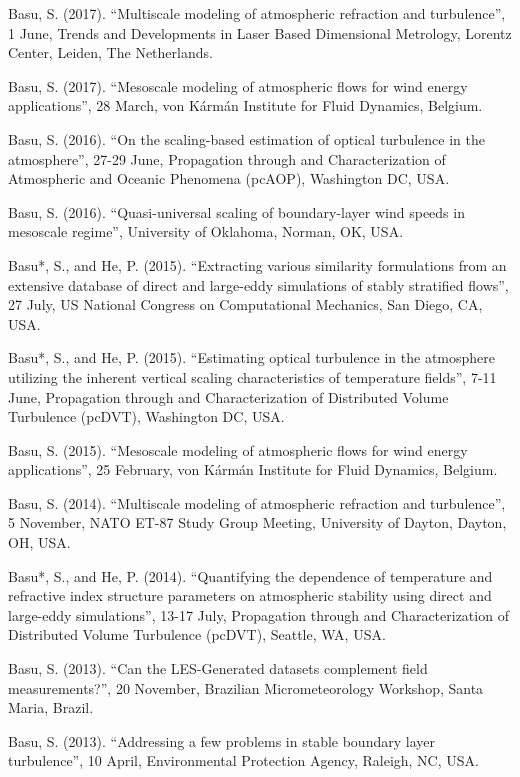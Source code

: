 \begin{etaremune}[topsep=0pt,itemsep=0pt,partopsep=0pt,parsep=0pt]
    \item Basu, S. (2017). ``Multiscale modeling of atmospheric refraction and turbulence'', 1 June, Trends and Developments in Laser Based Dimensional Metrology, Lorentz Center, Leiden, The Netherlands.
    \item Basu, S. (2017). ``Mesoscale modeling of atmospheric flows for wind energy applications'', 28 March, von K\'{a}rm\'{a}n Institute for Fluid Dynamics, Belgium.
    \item Basu, S. (2016). ``On the scaling-based estimation of optical turbulence in the atmosphere'', 27-29 June, Propagation through and Characterization of Atmospheric and Oceanic Phenomena (pcAOP), Washington DC, USA.
    \item Basu, S. (2016). ``Quasi-universal scaling of boundary-layer wind speeds in mesoscale regime'', University of Oklahoma, Norman, OK, USA.
    \item Basu*, S., and He, P. (2015). “Extracting various similarity formulations from an extensive database of direct and large-eddy simulations of stably stratified flows”, 27 July, US National Congress on Computational Mechanics, San Diego, CA, USA.
    \item Basu*, S., and He, P. (2015). ``Estimating optical turbulence in the atmosphere utilizing the inherent vertical scaling characteristics of temperature fields'', 7-11 June, Propagation through and Characterization of Distributed Volume Turbulence (pcDVT), Washington DC, USA.
    \item Basu, S. (2015). ``Mesoscale modeling of atmospheric flows for wind energy applications'', 25 February, von Kármán Institute for Fluid Dynamics, Belgium. 
    \item Basu, S. (2014). ``Multiscale modeling of atmospheric refraction and turbulence'', 5 November, NATO ET-87 Study Group Meeting, University of Dayton, Dayton, OH, USA. 
    \item Basu*, S., and He, P. (2014). ``Quantifying the dependence of temperature and refractive index structure parameters on atmospheric stability using direct and large-eddy simulations'', 13-17 July, Propagation through and Characterization of Distributed Volume Turbulence (pcDVT), Seattle, WA, USA. 
    \item Basu, S. (2013). ``Can the LES-Generated datasets complement field measurements?'', 20 November, Brazilian Micrometeorology Workshop, Santa Maria, Brazil.  
    \item Basu, S. (2013). ``Addressing a few problems in stable boundary layer turbulence'', 10 April, Environmental Protection Agency, Raleigh, NC, USA.

\end{etaremune}
